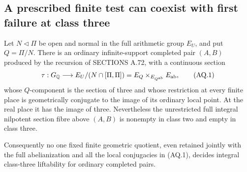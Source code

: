 \subsection{A prescribed finite test can coexist with first failure at class three}

\begin{theorem}
\label{thm:ghost-a72-first-class3}
Let \(N\triangleleft\Pi\) be open and normal in the full
arithmetic group \(E_U\), and put \(Q=\Pi/N\).
There is an ordinary infinite-support completed pair
\((A,B)\) produced by the recursion of SECTIONS A.72,
with a continuous section
\[
 \tau:G_{\mathbb Q}\longrightarrow
 E_U/(N\cap[\Pi,\Pi])
   =E_Q\times_{E_{Q^{\rm ab}}}E_{\rm ab},
 \tag{AQ.1}
\]
whose \(Q\)-component is the section of three and whose
restriction at every finite place is geometrically
conjugate to the image of its ordinary local point.
At the real place it has the image of three.
Nevertheless the unrestricted full integral nilpotent
section fibre above \((A,B)\) is nonempty in class two
and empty in class three.

Consequently no one fixed finite geometric quotient,
even retained jointly with the full abelianization and
all the local conjugacies in (AQ.1), decides integral
class-three liftability for ordinary completed pairs.
\end{theorem}
